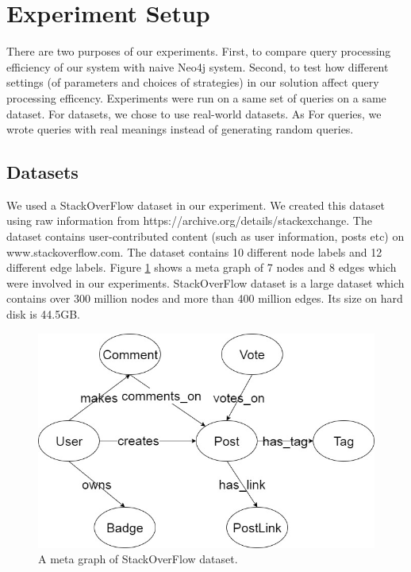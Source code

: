 
\section{Experiment Setup}


There are two purposes of our experiments. First, to compare query processing efficiency of our system with naive Neo4j system. Second, to test how different settings (of parameters and choices of strategies) in our solution affect query processing efficency. Experiments were run on a same set of queries on a same dataset. For datasets, we chose to use real-world datasets. As For queries, we wrote queries with real meanings instead of generating random queries. 

\subsection{Datasets}

We used a StackOverFlow dataset in our experiment. We created this dataset using raw information from https://archive.org/details/stackexchange. The dataset contains user-contributed content (such as user information, posts etc) on www.stackoverflow.com. The dataset contains 10 different node labels and 12 different edge labels.  Figure \ref{fig:5:1} shows a meta graph of 7 nodes and 8 edges which were involved in our experiments. StackOverFlow dataset is a large dataset which contains over 300 million nodes and more than 400 million edges. Its size on hard disk is 44.5GB. 

\begin{figure}[H]
	\centering
	\includegraphics[scale=0.5]{pic/MetaGraphExperiment (1).jpg}
	\caption{A meta graph of StackOverFlow dataset.}
	\label{fig:5:1}
\end{figure}  


